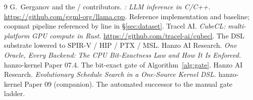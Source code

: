 \documentclass[11pt]{article}
\begin{document}
\begin{thebibliography}{9}
\small
{} G.~Gerganov and the / contributors. \emph{:
LLM inference in C/C++.} \url{https://github.com/ggml-org/llama.cpp}. Reference implementation and
 baseline;  coopmat pipeline referenced by line in \S\ref{sec:dataset}.
 Tracel AI. \emph{CubeCL: multi-platform GPU compute in Rust.}
\url{https://github.com/tracel-ai/cubecl}. The DSL substrate lowered to SPIR-V / HIP / PTX / MSL.
 Hanzo AI Research. \emph{One Oracle, Every Backend: The CPU Bit-Exactness Law and How It
Is Enforced.} hanzo-kernel Paper 07.4. The bit-exact gate of Algorithm~\ref{alg:gate}.
 Hanzo AI Research. \emph{Evolutionary Schedule Search in a One-Source Kernel DSL.}
hanzo-kernel Paper 09 (companion). The automated successor to the manual gate ladder.
\end{thebibliography}
\end{document}
